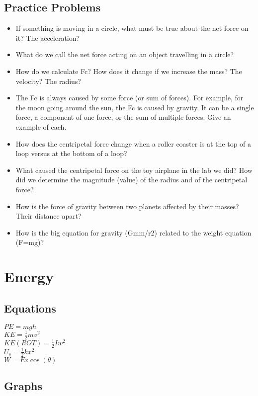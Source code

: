 \documentclass[11pt]{article}
\begin{document}
\subsection*{Practice Problems}
\label{sec:org26851be}
\begin{itemize}
\item If something is moving in a circle, what must be true about the net force on it? The acceleration?
\item What do we call the net force acting on an object travelling in a circle?
\item How do we calculate Fc? How does it change if we increase the mass?  The velocity? The radius?
\item The Fc is always caused by some force (or sum of forces). For example, for the moon going around the sun, the Fc is caused by gravity. It can be a single force, a component of one force, or the sum of multiple forces. Give an example of each.
\item How does the centripetal force change when a roller coaster is at the top of a loop versus at the bottom of a loop?
\item What caused the centripetal force on the toy airplane in the lab we did? How did we determine the magnitude (value) of the radius and of the centripetal force?
\item How is the force of gravity between two planets affected by their masses? Their distance apart?
\item How is the big equation for gravity (Gmm/r2) related to the weight equation (F=mg)?
\end{itemize}
\section*{Energy}
\label{sec:org1b82133}
\subsection*{Equations}
\label{sec:orgbc4cb09}
\(PE=mgh\) \\
\(KE=\frac12 mv^2\) \\
\(KE(ROT)=\frac12Iw^2\) \\
\(U_s=\frac12kx^2\) \\
\(W=Fx\cos(\theta)\) \\
\subsection*{Graphs}
\label{sec:orgee64a3b}
\end{document}
